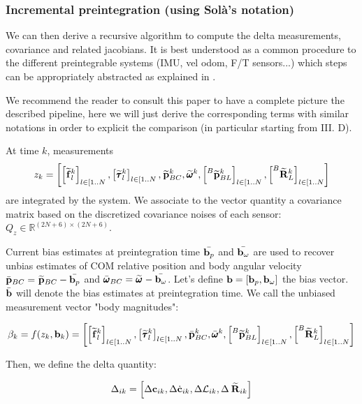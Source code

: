 \documentclass[11pt]{article}
\newcommand{\Rotm}[2]{\prescript{#1}{}{\widetilde{\bfR}}_{#2}}
\newcommand{\bias}{\bfb}
\newcommand{\posim}[2]{\prescript{#1}{}{\widetilde{\bfp}}_{#2}}
\newcommand{\posibar}{\bar{\bfp}}
\newcommand{\angvelm}[2]{\prescript{#1}{}{\widetilde{\pmb{\omega}}}_{#2}}
\newcommand{\angvelbar}{\bar{\pmb{\omega}}}
\newcommand{\forcem}[2]{\prescript{#1}{}{\widetilde{\bff}}_{#2}}
\newcommand{\torquem}[2]{\prescript{#1}{}{\widetilde{\pmb{\tau}}}_{#2}}
\newcommand{\AM}{\mathcal{L}}
\newcommand{\COM}{\bfc}
\newcommand{\COMd}{\dot{\bfc}}
\newcommand{\Reals}{\mathbb{R}}
\begin{document}
\subsubsection{Incremental preintegration (using Solà's notation)}
We can then derive a recursive algorithm to compute the delta measurements, covariance and related jacobians. It is best understood as a common procedure to the different preintegrable systems (IMU, vel odom, F/T sensors...) which steps can be appropriately abstracted as explained in \cite{atchuthan2018odometry}.  

We recommend the reader to consult this paper to have a complete picture the described pipeline, here we will just derive the corresponding terms with similar notations in order to explicit the comparison (in particular starting from III. D).

At time $k$, measurements
%
\begin{equation}
z_k = \left[ \left[\forcem{}{l}^k \right]_{l \in [1..N}, \left[\torquem{}{l}^k \right]_{l \in [1..N}, \posim{}{BC}^k, \angvelm{}{}^k, \left[\posim{B}{BL}^k \right]_{l \in [1..N}, \left[\Rotm{B}{L}^k \right]_{l \in [1..N}\right]
\end{equation}
%
are integrated by the system. We associate to the vector quantity a covariance matrix based on the discretized covariance noises of each sensor: $Q_{z} \in \Reals^{(2N+6) \times (2N+6)}$.

Current bias estimates at preintegration time $\bar{\bias_p}$ and $\bar{\bias_{\omega}}$ are used to recover unbias estimates of COM relative position and body angular velocity $\posibar_{BC} = \posim{}{BC} - \bar{\bias_p}$ and $\angvelbar_{BC} = \angvelm{}{} - \bar{\bias_{\omega}}$. Let's define $\bias = \left[\bias_p, \bias_{\omega} \right]$ the bias vector. $\bar{\bias}$ will denote the bias estimates at preintegration time. We call the unbiased measurement vector "body magnitudes":

\begin{equation}
    \beta_k = f(z_k, \bias_k) = \left[ \left[\forcem{}{l}^k \right]_{l \in [1..N}, \left[\torquem{}{l}^k \right]_{l \in [1..N}, \posibar_{BC}^k, \angvelbar{}{}^k, \left[\posim{B}{BL}^k \right]_{l \in [1..N}, \left[\Rotm{B}{L}^k \right]_{l \in [1..N}\right]
\end{equation}

Then, we define the delta quantity:

\begin{equation}
    \Delta_{ik} = \left[ \Delta \COM_{ik}, \Delta \COMd_{ik}, \Delta \AM_{ik}, \Delta \Rotm{}{ik} \right]
\end{equation}
\end{document}

